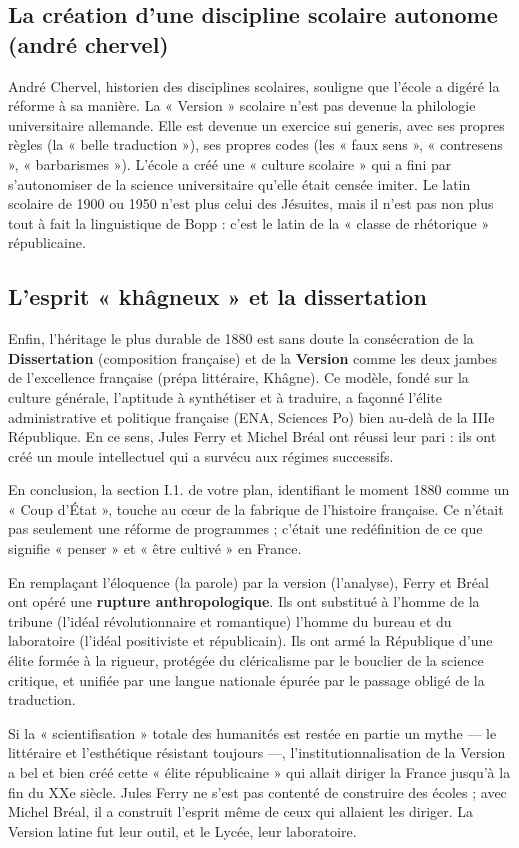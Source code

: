 \subsection{La création d'une discipline scolaire autonome (andré chervel)}

André Chervel, historien des disciplines scolaires, souligne que l'école a digéré la réforme à sa
manière. La « Version » scolaire n'est pas devenue la philologie universitaire allemande. Elle est
devenue un exercice sui generis, avec ses propres règles (la « belle traduction »), ses propres
codes (les « faux sens », « contresens », « barbarismes »). L'école a créé une « culture scolaire »
qui a fini par s'autonomiser de la science universitaire qu'elle était censée imiter. Le latin
scolaire de 1900 ou 1950 n'est plus celui des Jésuites, mais il n'est pas non plus tout à fait la
linguistique de Bopp : c'est le latin de la « classe de rhétorique » républicaine.\cite{I-1-2-ref27}



\subsection{L'esprit « khâgneux » et la dissertation}

Enfin, l'héritage le plus durable de 1880 est sans doute la consécration de la \textbf{Dissertation}
(composition française) et de la \textbf{Version} comme les deux jambes de l'excellence française
(prépa littéraire, Khâgne). Ce modèle, fondé sur la culture générale, l'aptitude à synthétiser et à
traduire, a façonné l'élite administrative et politique française (ENA, Sciences Po) bien au-delà de
la IIIe République. En ce sens, Jules Ferry et Michel Bréal ont réussi leur pari : ils ont créé un
moule intellectuel qui a survécu aux régimes successifs.\cite{I-1-2-ref25}

En conclusion, la section I.1.\cite{I-1-2-ref2} de votre plan, identifiant le moment 1880 comme un «
Coup d'État », touche au cœur de la fabrique de l'histoire française. Ce n'était pas seulement une
réforme de programmes ; c'était une redéfinition de ce que signifie « penser » et « être cultivé »
en France.

En remplaçant l'éloquence (la parole) par la version (l'analyse), Ferry et Bréal ont opéré une
\textbf{rupture anthropologique}. Ils ont substitué à l'homme de la tribune (l'idéal révolutionnaire
et romantique) l'homme du bureau et du laboratoire (l'idéal positiviste et républicain). Ils ont
armé la République d'une élite formée à la rigueur, protégée du cléricalisme par le bouclier de la
science critique, et unifiée par une langue nationale épurée par le passage obligé de la traduction.

Si la « scientifisation » totale des humanités est restée en partie un mythe — le littéraire et
l'esthétique résistant toujours —, l'institutionnalisation de la Version a bel et bien créé cette «
élite républicaine » qui allait diriger la France jusqu'à la fin du XXe siècle. Jules Ferry ne s'est
pas contenté de construire des écoles ; avec Michel Bréal, il a construit l'esprit même de ceux qui
allaient les diriger. La Version latine fut leur outil, et le Lycée, leur laboratoire.

